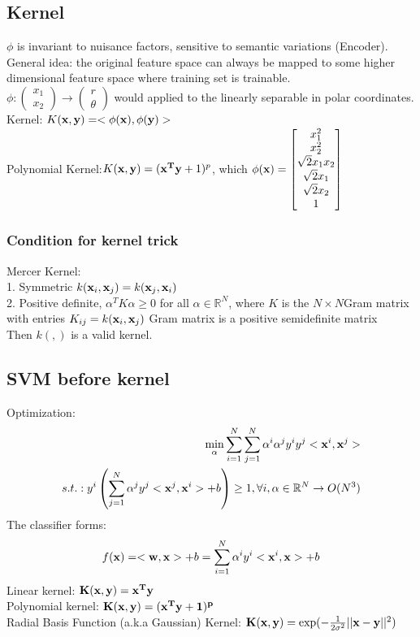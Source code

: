 \documentclass[12pt,a4paper]{article}
\begin{document}
\subsection*{Kernel}
$\phi$ is invariant to nuisance factors, sensitive to semantic variations (Encoder).\\
General idea: the original feature space can always be mapped  to some higher dimensional feature space where training set is trainable.\\
$\phi: \left(\begin{matrix}x_1\\x_2\end{matrix}\right)\rightarrow \left(\begin{matrix}r\\\theta\end{matrix}\right)$ would applied to the linearly separable in polar coordinates.\\
Kernel: $K({\bf x,y})= <\phi({\bf x}),\phi({\bf y})>$\\
Polynomial Kernel:$K({\bf x,y})=({\bf x^Ty}+1)^p$, which $\phi({\bf x}) = \left[\begin{matrix}
x_1^2\\x_2^2\\ \sqrt2x_1x_2 \\ \sqrt2x_1 \\ \sqrt2x_2 \\ 1
\end{matrix}\right]$\\
\subsubsection*{Condition for kernel trick}
Mercer Kernel:\\
1. Symmetric $k({\bf x}_i,{\bf x}_j) = k({\bf x}_j,{\bf x}_i)$\\
2. Positive definite, $\alpha^TK\alpha\ge0$ for all $\alpha \in \mathbb{R}^N$, where $K$ is the $N\times N$Gram matrix with entries $K_{ij}=k({\bf x}_i,{\bf x}_j)$ Gram matrix is a positive semidefinite matrix\\
Then $k(,)$ is a valid kernel.
\subsection*{SVM before kernel}
Optimization:
\begin{eqnarray*}
\min_\alpha\sum_{i=1}^N\sum_{j=1}^N\alpha^i\alpha^jy^iy^j<{\bf x}^i,{\bf x}^j>\\
s.t.: y^i\left(\sum_{j=1}^N\alpha^jy^j<{\bf x}^j,{\bf x}^i>+b\right)\ge 1, \forall i, {\bf \alpha}\in \mathbb{R}^N\rightarrow O(N^3)
\end{eqnarray*}
The classifier forms:
$$
f({\bf x}) = <{\bf w},{\bf x}>+b = \sum_{i=1}^N\alpha^iy^i<{\bf x}^i,{\bf x}>+b
$$
Linear kernel: $\bf K(x,y)=x^Ty$\\
Polynomial kernel: $\bf K(x,y) = (x^Ty+1)^p$\\
Radial Basis Function (a.k.a Gaussian) Kernel: ${\bf K(x,y)} = \exp(-\frac{1}{2\sigma^2}||{\bf x-y}||^2)$
\end{document}
